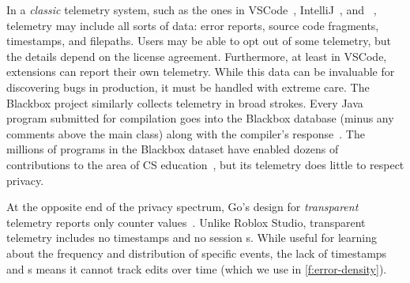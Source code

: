 \documentclass[english,submission,cleveref]{programming}
\begin{document}
In a \emph{classic} telemetry system, such as the ones in
VSCode~\cite{vscode-telemetry}, IntelliJ~\cite{intellij-telemetry}, and
~\cite{dotnet-telemetry},
telemetry may include all sorts of
data: error reports, source code fragments, time\-stamps, and filepaths.
Users may be able to opt out of some telemetry, but the details depend on the
license agreement.
Furthermore, at least in VSCode, \IDE{} extensions can report their own telemetry.
While this data can be invaluable for discovering bugs in production, it
must be handled with extreme care.
The Blackbox project similarly collects telemetry in broad strokes.
Every Java program submitted for compilation goes into the Blackbox database (minus
any comments above the main class) along with the compiler's response~\cite{bkmu-sigcse-2014}.
The millions of programs in the Blackbox dataset
have enabled dozens of contributions to the area of CS
education~\cite{bask-icer-2018}, but its telemetry does little to respect privacy.


At the opposite end of the privacy spectrum, Go's design for \emph{transparent}
telemetry reports only counter values~\cite{transparent-telemetry}.
Unlike Roblox Studio, transparent telemetry includes no timestamps and no 
session \uid{}s.
While useful for learning about the frequency and distribution of
specific events, the lack of timestamps and \uid{}s means it cannot track
edits over time (which we use in \cref{f:error-density}).
\end{document}
